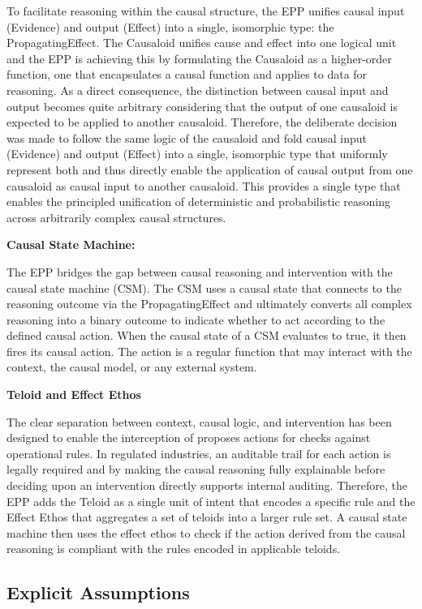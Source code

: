 To facilitate reasoning within the causal structure, the EPP unifies causal input (Evidence) and output (Effect) into a single, isomorphic type: the PropagatingEffect. The Causaloid unifies cause and effect into one logical unit and the EPP is achieving this by formulating the Causaloid as a higher-order function, one that encapsulates a causal function and applies to data for reasoning. As a direct consequence, the distinction between causal input and output becomes quite arbitrary considering that the output of one causaloid is expected to be applied to another causaloid. Therefore, the deliberate decision was made to follow the same logic of the causaloid and fold causal input (Evidence) and output (Effect) into a single, isomorphic type that uniformly represent both and thus directly enable the application of causal output from one causaloid as causal input to another causaloid. This provides a single type that enables the principled unification of deterministic and probabilistic reasoning across arbitrarily complex causal structures. 
 

\textbf{Causal State Machine:}

The EPP bridges the gap between causal reasoning and intervention with the causal state machine (CSM). The CSM uses a causal state that connects to the reasoning outcome via the  PropagatingEffect and ultimately converts all complex reasoning into a binary outcome to indicate whether to act according to the defined causal action. When the causal state of a CSM evaluates to true, it then fires its causal action. The action is a regular function that may interact with the context, the causal model, or any external system.  

\textbf{Teloid and Effect Ethos}

The clear separation between context, causal logic, and intervention has been designed to enable the interception of proposes actions for checks against operational rules. In regulated industries, an auditable trail for each action is legally required  and by making the causal reasoning fully explainable before deciding upon an intervention directly supports internal auditing. Therefore, the EPP adds the Teloid as a single unit of intent that encodes a specific rule and the Effect Ethos that aggregates a set of teloids into a larger rule set. A causal state machine then uses the effect ethos to check if the action derived from the causal reasoning is compliant with the rules encoded in applicable teloids.    

%
%
\subsection{Explicit Assumptions}
\label{sec:assumptions}
 

